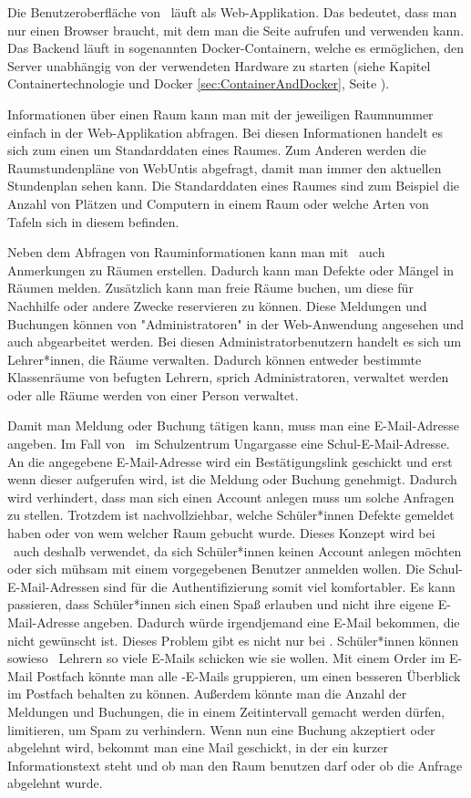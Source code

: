 Die Benutzeroberfläche von \ZELIA\ läuft als Web-Applikation. Das bedeutet, dass man nur einen Browser braucht, mit dem man die Seite aufrufen und verwenden kann. Das Backend läuft in sogenannten Docker-Containern, welche es ermöglichen, den Server unabhängig von der verwendeten Hardware zu starten (siehe Kapitel Containertechnologie und Docker \ref{sec:ContainerAndDocker}, Seite \pageref{sec:ContainerAndDocker}).

Informationen über einen Raum kann man mit der jeweiligen Raumnummer einfach in der Web-Applikation abfragen. Bei diesen Informationen handelt es sich zum einen um Standarddaten eines Raumes. Zum Anderen werden die Raumstundenpläne von WebUntis abgefragt, damit man immer den aktuellen Stundenplan sehen kann. Die Standarddaten eines Raumes sind zum Beispiel die Anzahl von Plätzen und Computern in einem Raum oder welche Arten von Tafeln sich in diesem befinden.

Neben dem Abfragen von Rauminformationen kann man mit \ZELIA\ auch Anmerkungen zu Räumen erstellen. Dadurch kann man Defekte oder Mängel in Räumen melden. Zusätzlich kann man freie Räume buchen, um diese für Nachhilfe oder andere Zwecke reservieren zu können. Diese Meldungen und Buchungen können von "Administratoren" in der Web-Anwendung angesehen und auch abgearbeitet werden. Bei diesen Administratorbenutzern handelt es sich um Lehrer*innen, die Räume verwalten. Dadurch können entweder bestimmte Klassenräume von befugten Lehrern, sprich Administratoren, verwaltet werden oder alle Räume werden von einer Person verwaltet.

Damit man Meldung oder Buchung tätigen kann, muss man eine E-Mail-Adresse angeben. Im Fall von \ZELIA\ im Schulzentrum Ungargasse eine Schul-E-Mail-Adresse. An die angegebene E-Mail-Adresse wird ein Bestätigungslink geschickt und erst wenn dieser aufgerufen wird, ist die Meldung oder Buchung genehmigt. Dadurch wird verhindert, dass man sich einen Account anlegen muss um solche Anfragen zu stellen. Trotzdem ist nachvollziehbar, welche Schüler*innen Defekte gemeldet haben oder von wem welcher Raum gebucht wurde. Dieses Konzept wird bei \ZELIA\ auch deshalb verwendet, da sich Schüler*innen keinen Account anlegen möchten oder sich mühsam mit einem vorgegebenen Benutzer anmelden wollen. Die Schul-E-Mail-Adressen sind für die Authentifizierung somit viel komfortabler. Es kann passieren, dass Schüler*innen sich einen Spaß erlauben und nicht ihre eigene E-Mail-Adresse angeben. Dadurch würde irgendjemand eine E-Mail bekommen, die nicht gewünscht ist. Dieses Problem gibt es nicht nur bei \ZELIA. Schüler*innen können sowieso \zb\ Lehrern so viele E-Mails schicken wie sie wollen. Mit einem Order im E-Mail Postfach könnte man alle \ZELIA-E-Mails gruppieren, um einen besseren Überblick im Postfach behalten zu können. Außerdem könnte man die Anzahl der Meldungen und Buchungen, die in einem Zeitintervall gemacht werden dürfen, limitieren, um Spam zu verhindern. Wenn nun eine Buchung akzeptiert oder abgelehnt wird, bekommt man eine Mail geschickt, in der ein kurzer Informationstext steht und ob man den Raum benutzen darf oder ob die Anfrage abgelehnt wurde.

